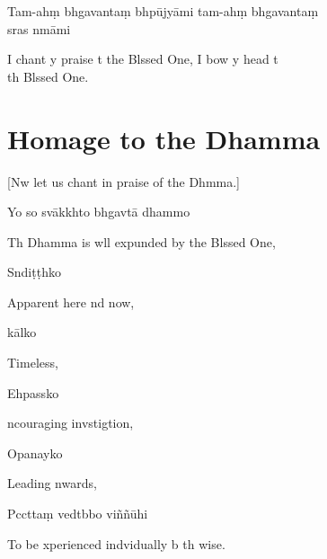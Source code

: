 Tam-ahṃ bhgavantaṃ bhpūjyāmi tam-ahṃ bhgavantaṃ \\s{}ras nmāmi

\begin{english}
  I chant y praise t the Blssed One, I bow y head t \\th{} Blssed One.
\end{english}


\chapter{Homage to the Dhamma}

\begin{leader}
\end{leader}

\begin{english}
[Nw let us chant in praise of the Dhmma.]
\end{english}

Yo so svākkhto bhgavtā dhammo

\begin{english}
  Th Dhamma is wll expunded by the Blssed One,
\end{english}

Sndiṭṭhko

\begin{english}
  Apparent here nd now,
\end{english}

kālko

\begin{english}
  Timeless,
\end{english}

Ehpassko

\begin{english}
  ncouraging invstigtion,
\end{english}

Opanayko

\begin{english}
  Leading nwards,
\end{english}

Pccttaṃ vedtbbo viññūhi

\begin{english}
  To be xperienced indvidually b th wise.
\end{english}

